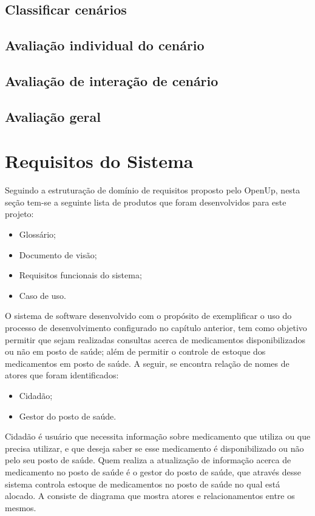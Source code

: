 \subsection{Classificar cenários}

\subsection{Avaliação individual do cenário}

\subsection{Avaliação de interação de cenário}

\subsection{Avaliação geral}


\section{Requisitos do Sistema}
\label{sec:visão do sistema}

Seguindo a estruturação de domínio de requisitos proposto pelo \acrfull{OpenUp}, nesta seção tem-se a seguinte lista de produtos que foram desenvolvidos para este projeto:
\begin{itemize}
    \item Glossário;
    \item Documento de visão;
    \item Requisitos funcionais do sistema;
    \item Caso de uso.
\end{itemize}

O sistema de software desenvolvido com o propósito de  exemplificar o uso do processo de desenvolvimento configurado no capítulo anterior, tem como objetivo permitir que sejam realizadas consultas acerca de medicamentos disponibilizados ou não em posto de saúde; além de permitir o controle de estoque dos medicamentos em posto de saúde. A seguir, se encontra relação de nomes de atores que foram identificados:

\begin{itemize}
    \item Cidadão;
    \item Gestor do posto de saúde.
\end{itemize}

Cidadão é usuário que necessita informação sobre medicamento que utiliza ou que precisa utilizar, e que deseja saber se esse medicamento é disponibilizado ou não pelo seu posto de saúde. Quem realiza a atualização de informação acerca de medicamento no posto de saúde é o gestor do posto de saúde, que através desse sistema controla estoque de medicamentos no posto de saúde no qual está alocado. A  consiste de diagrama que mostra atores e relacionamentos entre os mesmos.

